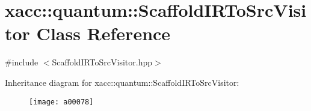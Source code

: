 \hypertarget{a00078}{}\section{xacc\+:\+:quantum\+:\+:Scaffold\+I\+R\+To\+Src\+Visitor Class Reference}
\label{a00078}


{\ttfamily \#include $<$Scaffold\+I\+R\+To\+Src\+Visitor.\+hpp$>$}

Inheritance diagram for xacc\+:\+:quantum\+:\+:Scaffold\+I\+R\+To\+Src\+Visitor\+:\begin{figure}[H]
\begin{center}
\leavevmode
\texttt{[image: a00078]}
\end{center}
\end{figure}

